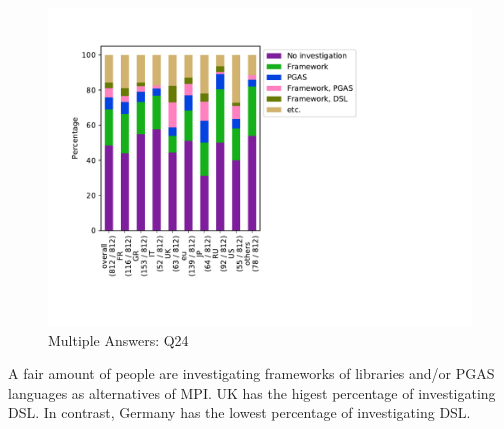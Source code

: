 \begin{figure}[htb]
\begin{center}
\includegraphics[width=14cm]{../pdfs/Q24-mans.pdf}
\caption{Multiple Answers: Q24}
\label{fig:Q24-mans}
\end{center}
\end{figure}

A fair amount of people are investigating frameworks of libraries
and/or PGAS languages as alternatives of MPI.  UK has the higest
percentage of investigating DSL. In contrast, Germany has the lowest
percentage of investigating DSL. 
